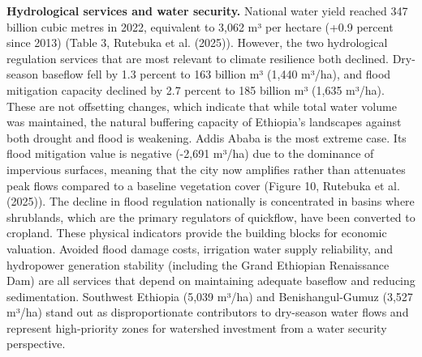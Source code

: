 \documentclass[
  letterpaper,
  DIV=11,
  numbers=noendperiod]{scrartcl}
\begin{document}
\textbf{Hydrological services and water security.} National water yield
reached 347 billion cubic metres in 2022, equivalent to 3,062 m³ per
hectare (+0.9 percent since 2013) (Table 3, Rutebuka et al. (2025)).
However, the two hydrological regulation services that are most relevant
to climate resilience both declined. Dry-season baseflow fell by 1.3
percent to 163 billion m³ (1,440 m³/ha), and flood mitigation capacity
declined by 2.7 percent to 185 billion m³ (1,635 m³/ha). These are not
offsetting changes, which indicate that while total water volume was
maintained, the natural buffering capacity of Ethiopia's landscapes
against both drought and flood is weakening. Addis Ababa is the most
extreme case. Its flood mitigation value is negative (-2,691 m³/ha) due
to the dominance of impervious surfaces, meaning that the city now
amplifies rather than attenuates peak flows compared to a baseline
vegetation cover (Figure 10, Rutebuka et al. (2025)). The decline in
flood regulation nationally is concentrated in basins where shrublands,
which are the primary regulators of quickflow, have been converted to
cropland. These physical indicators provide the building blocks for
economic valuation. Avoided flood damage costs, irrigation water supply
reliability, and hydropower generation stability (including the Grand
Ethiopian Renaissance Dam) are all services that depend on maintaining
adequate baseflow and reducing sedimentation. Southwest Ethiopia (5,039
m³/ha) and Benishangul-Gumuz (3,527 m³/ha) stand out as disproportionate
contributors to dry-season water flows and represent high-priority zones
for watershed investment from a water security perspective.
\end{document}
